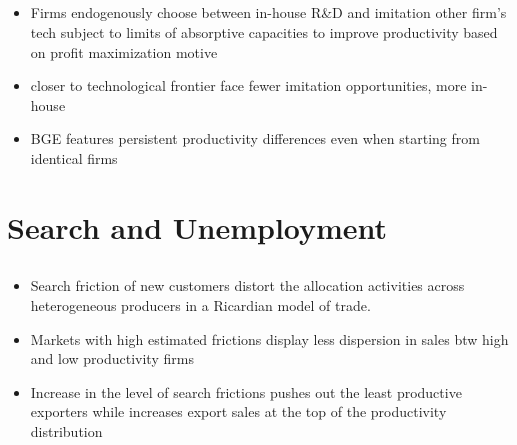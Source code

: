\documentclass[10pt]{article} %
\begin{document}
    \subsection{\cite{KoenigLorenzZilibotti2016}}
    \begin{itemize}
        \item Firms endogenously choose between in-house R\&D and imitation other firm's tech subject to limits of absorptive capacities to improve productivity based on profit maximization motive
        \item closer to technological frontier face fewer imitation opportunities, more in-house
        \item BGE features persistent productivity differences even when starting from identical firms
    \end{itemize}




\section{Search and Unemployment}
    \subsection{\cite{MortensenPissarides1994}}
    \subsection{\cite{Shimer2005}}

    \subsection{\cite{HornsteinKrusellViolante2011}}

    \subsection{\cite{LenoirMartinMejean2022}}
    \begin{itemize}
        \item Search friction of new customers distort the allocation activities across heterogeneous producers in a Ricardian model of trade.
        \item Markets with high estimated frictions display less dispersion in sales btw high and low productivity firms
        \item Increase in the level of search frictions pushes out the least productive exporters while increases export sales at the top of the productivity distribution
    \end{itemize}
\end{document}
